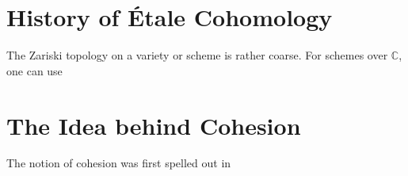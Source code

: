 
\section*{History of \'Etale Cohomology}
The Zariski topology on a variety or scheme is rather coarse. For schemes over $\mathbb{C}$, one can use 
\cite{milneLEC}
\section*{The Idea behind Cohesion}
The notion of cohesion was first spelled out in \cite{lawvere:2007}